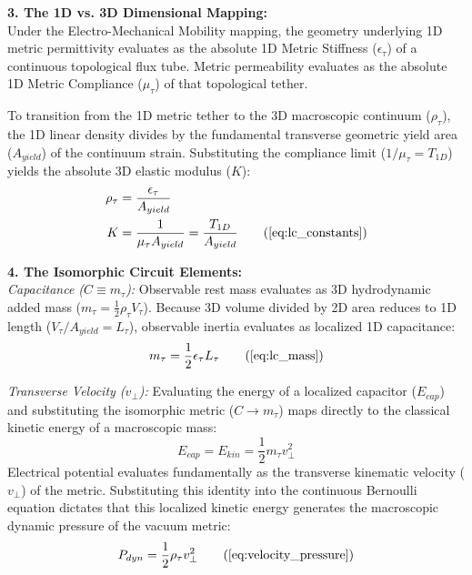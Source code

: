 \documentclass[11pt, a4paper]{article}
\begin{document}
\textbf{3. The 1D vs. 3D Dimensional Mapping:} \\
Under the Electro-Mechanical Mobility mapping, the geometry underlying 1D metric permittivity evaluates as the absolute 1D Metric Stiffness ($\epsilon_{\tau}$) of a continuous topological flux tube. Metric permeability evaluates as the absolute 1D Metric Compliance ($\mu_{\tau}$) of that topological tether. 

To transition from the 1D metric tether to the 3D macroscopic continuum ($\rho_{\tau}$), the 1D linear density divides by the fundamental transverse geometric yield area ($A_{yield}$) of the continuum strain. Substituting the compliance limit ($1/\mu_{\tau} = T_{1D}$) yields the absolute 3D elastic modulus ($K$):
\begin{align}
    \rho_{\tau} &= \frac{\epsilon_{\tau}}{A_{yield}} \nonumber \\
    K &= \frac{1}{\mu_{\tau} A_{yield}} = \frac{T_{1D}}{A_{yield}} \tag{\ref{eq:lc_constants}}
\end{align}

\textbf{4. The Isomorphic Circuit Elements:} \\
\textit{Capacitance ($C \equiv m_\tau$):} Observable rest mass evaluates as 3D hydrodynamic added mass ($m_\tau = \frac{1}{2} \rho_{\tau} V_\tau$). Because 3D volume divided by 2D area reduces to 1D length ($V_\tau/A_{yield} = L_\tau$), observable inertia evaluates as localized 1D capacitance:
\begin{equation}
    m_\tau = \frac{1}{2} \epsilon_{\tau} L_\tau \tag{\ref{eq:lc_mass}}
\end{equation}

\textit{Transverse Velocity ($v_{\perp}$):} Evaluating the energy of a localized capacitor ($E_{cap}$) and substituting the isomorphic metric ($C \to m_\tau$) maps directly to the classical kinetic energy of a macroscopic mass:
\begin{equation}
    E_{cap} = E_{kin} = \frac{1}{2} m_\tau v_{\perp}^2
\end{equation}
Electrical potential evaluates fundamentally as the transverse kinematic velocity ($v_{\perp}$) of the metric. Substituting this identity into the continuous Bernoulli equation dictates that this localized kinetic energy generates the macroscopic dynamic pressure of the vacuum metric:
\begin{equation}
    P_{dyn} = \frac{1}{2}\rho_{\tau} v_{\perp}^2 \tag{\ref{eq:velocity_pressure}}
\end{equation}
\end{document}
